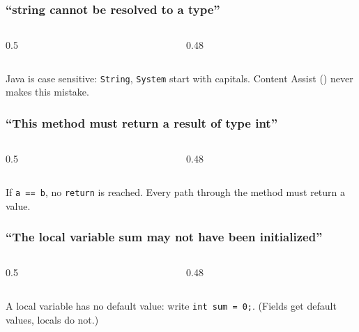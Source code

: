 \documentclass[aspectratio=169,10pt,compress]{beamer}
\begin{document}
\begin{frame}[t,fragile] \frametitle{``string cannot be resolved to a type''}
  \begin{columns}[T]
    \begin{column}{0.5\textwidth}
    \end{column}
    \begin{column}{0.48\textwidth}
    \end{column}
  \end{columns}

  \vspace{0.2em}
  \small Java is case sensitive: \texttt{String}, \texttt{System} start with capitals. Content Assist () never makes this mistake.
\end{frame}




\begin{frame}[t,fragile] \frametitle{``This method must return a result of type int''}
  \begin{columns}[T]
    \begin{column}{0.5\textwidth}
    \end{column}
    \begin{column}{0.48\textwidth}
    \end{column}
  \end{columns}

  \vspace{0.2em}
  \small If \texttt{a == b}, no \texttt{return} is reached. Every path through the method must return a value.
\end{frame}




\begin{frame}[t,fragile] \frametitle{``The local variable sum may not have been initialized''}
  \begin{columns}[T]
    \begin{column}{0.5\textwidth}
    \end{column}
    \begin{column}{0.48\textwidth}
    \end{column}
  \end{columns}

  \vspace{0.2em}
  \small A local variable has no default value: write \texttt{int sum = 0;}. (Fields get default values, locals do not.)
\end{frame}
\end{document}

